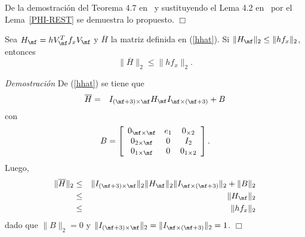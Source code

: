  De la demostraci\'on del Teorema 4.7 en~\cite{Saad92} y sustituyendo el Lema 4.2 en~\cite{Saad92} por el Lema~\ref{PHI-REST}
se demuestra lo propuesto. $\Box$\\

\begin{lemma}\label{H-bound}
Sea $H_\mf=hV^{T}_\mf f_xV_\mf$ y $\overline{H}$ la matriz definida en  (\ref{hhat}). Si $\lVert H_\mf \rVert_2\leq\lVert hf_x\rVert_2$, entonces
\[ \lVert\overline{H}\rVert_2 \leq \lVert hf_x\rVert_2. \]
\end{lemma}
\emph{Demostraci\'on}
De (\ref{hhat}) se tiene que
\begin{eqnarray*}
	\overline{H}&=&I_{(\mf+3)\times\mf}H_\mf I_{\mf\times(\mf+3)}+B
\end{eqnarray*}
con
\[B=\left[\begin{array}{ccc}
0_{\mf\times\mf} & e_1 & 0_{\times 2}\\
0_{2\times\mf} & 0 & I_2\\
0_{1\times\mf} & 0 & 0_{1\times 2}
\end{array}\right].\]
Luego, 
\begin{eqnarray*}
    \lVert\overline{H}\rVert_2 &\leq& \lVert I_{(\mf+3)\times\mf} \rVert_2 \lVert H_\mf \rVert_2 \lVert I_{\mf\times(\mf+3)} \rVert_2+ \lVert B \rVert_2\\
    &\leq&\lVert H_\mf \rVert_2\\
    &\leq& \lVert hf_x\rVert_2
\end{eqnarray*}
dado que $\lVert B\rVert_2=0$ y $\lVert I_{(\mf+3)\times\mf}\rVert_2=
\lVert I_{\mf\times(\mf+3)}\rVert_2=1$.   $\Box$\\

